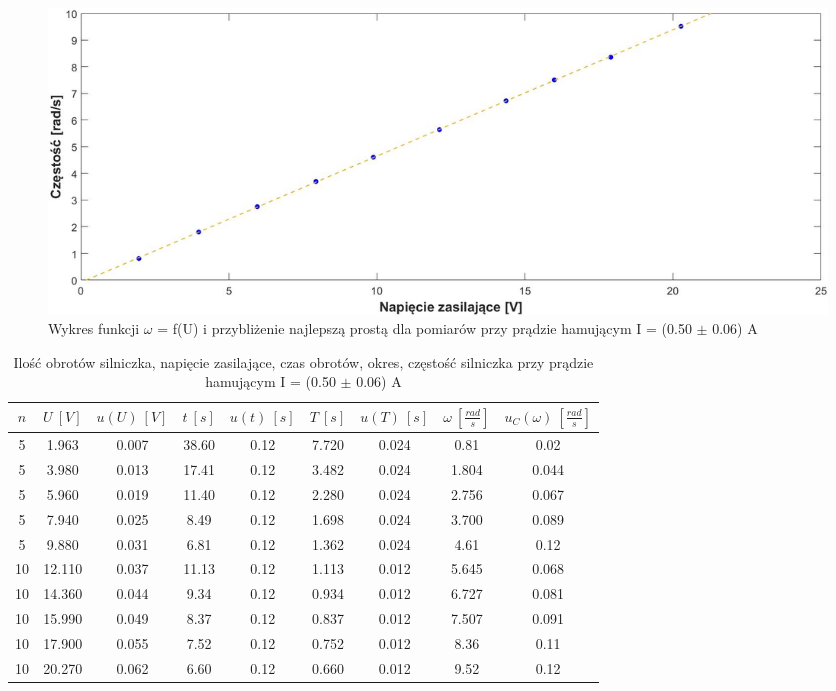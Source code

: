 \documentclass[12pt, a4paper, oneside]{article}
\begin{document}
\begin{figure}[h]
\centering
\caption{Wykres funkcji $\omega$ = f(U) i przybliżenie najlepszą prostą dla pomiarów przy prądzie hamującym I = (0.50 $\pm$ 0.06) A}
\includegraphics[scale=0.3]{f6.png}
\end{figure}
\begin{table}[h]
  \centering
  \caption{Ilość obrotów silniczka, napięcie zasilające, czas obrotów, okres, częstość silniczka przy prądzie hamującym I = (0.50 $\pm$ 0.06) A}
    \begin{tabular}{|c|c|c|c|c|c|c|c|c|}\hline
    $n$ & $U~[V]$ & $u(U)~[V]$ & $t~[s]$ & $u(t)~[s]$ & $T~[s]$ & $u(T)~[s]$ & $\omega~[\frac{rad}{s}]$ & $u_C(\omega)~[\frac{rad}{s}]$ \\\hline
    5 & 1.963 & 0.007 & 38.60 & 0.12 & 7.720 & 0.024 & 0.81 & 0.02 \\\hline
    5 & 3.980 & 0.013 & 17.41 & 0.12 & 3.482 & 0.024 & 1.804 & 0.044 \\\hline
    5 & 5.960 & 0.019 & 11.40 & 0.12 & 2.280 & 0.024 & 2.756 & 0.067 \\\hline
    5 & 7.940 & 0.025 & 8.49 & 0.12 & 1.698 & 0.024 & 3.700 & 0.089 \\\hline
    5 & 9.880 & 0.031 & 6.81 & 0.12 & 1.362 & 0.024 & 4.61 & 0.12 \\\hline
    10 & 12.110 & 0.037 & 11.13 & 0.12 & 1.113 & 0.012 & 5.645 & 0.068 \\\hline
    10 & 14.360 & 0.044 & 9.34 & 0.12 & 0.934 & 0.012 & 6.727 & 0.081 \\\hline
    10 & 15.990 & 0.049 & 8.37 & 0.12 & 0.837 & 0.012 & 7.507 & 0.091 \\\hline
    10 & 17.900 & 0.055 & 7.52 & 0.12 & 0.752 & 0.012 & 8.36 & 0.11 \\\hline
    10 & 20.270 & 0.062 & 6.60 & 0.12 & 0.660 & 0.012 & 9.52 & 0.12 \\\hline
    \end{tabular}%
  \label{tab:addlabel}%
\end{table}%
\end{document}

